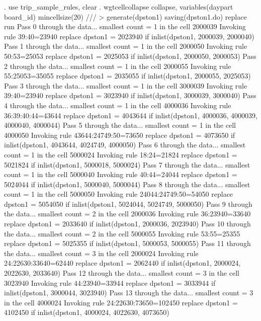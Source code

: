 . use trip_sample_rules, clear
{\smallskip}
. wgtcellcollapse collapse, variables(daypart board_id) mincellsize(20) ///
>         generate(dpston1) saving(dpston1.do) replace run
Pass 0 through the data...
  smallest count = 1 in the cell      2000039
  Invoking rule 39:40=23940
  replace dpston1 = 2023940 if inlist(dpston1, 2000039, 2000040)
Pass 1 through the data...
  smallest count = 1 in the cell      2000050
  Invoking rule 50:53=25053
  replace dpston1 = 2025053 if inlist(dpston1, 2000050, 2000053)
Pass 2 through the data...
  smallest count = 1 in the cell      2000055
  Invoking rule 55:25053=35055
  replace dpston1 = 2035055 if inlist(dpston1, 2000055, 2025053)
Pass 3 through the data...
  smallest count = 1 in the cell      3000039
  Invoking rule 39:40=23940
  replace dpston1 = 3023940 if inlist(dpston1, 3000039, 3000040)
Pass 4 through the data...
  smallest count = 1 in the cell      4000036
  Invoking rule 36:39:40:44=43644
  replace dpston1 = 4043644 if inlist(dpston1, 4000036, 4000039, 4000040, 4000044)
Pass 5 through the data...
  smallest count = 1 in the cell      4000050
  Invoking rule 43644:24749:50=73650
  replace dpston1 = 4073650 if inlist(dpston1, 4043644, 4024749, 4000050)
Pass 6 through the data...
  smallest count = 1 in the cell      5000024
  Invoking rule 18:24=21824
  replace dpston1 = 5021824 if inlist(dpston1, 5000018, 5000024)
Pass 7 through the data...
  smallest count = 1 in the cell      5000040
  Invoking rule 40:44=24044
  replace dpston1 = 5024044 if inlist(dpston1, 5000040, 5000044)
Pass 8 through the data...
  smallest count = 1 in the cell      5000050
  Invoking rule 24044:24749:50=54050
  replace dpston1 = 5054050 if inlist(dpston1, 5024044, 5024749, 5000050)
Pass 9 through the data...
  smallest count = 2 in the cell      2000036
  Invoking rule 36:23940=33640
  replace dpston1 = 2033640 if inlist(dpston1, 2000036, 2023940)
Pass 10 through the data...
  smallest count = 2 in the cell      5000055
  Invoking rule 53:55=25355
  replace dpston1 = 5025355 if inlist(dpston1, 5000053, 5000055)
Pass 11 through the data...
  smallest count = 3 in the cell      2000024
  Invoking rule 24:22630:33640=62440
  replace dpston1 = 2062440 if inlist(dpston1, 2000024, 2022630, 2033640)
Pass 12 through the data...
  smallest count = 3 in the cell      3023940
  Invoking rule 44:23940=33944
  replace dpston1 = 3033944 if inlist(dpston1, 3000044, 3023940)
Pass 13 through the data...
  smallest count = 3 in the cell      4000024
  Invoking rule 24:22630:73650=102450
  replace dpston1 = 4102450 if inlist(dpston1, 4000024, 4022630, 4073650)
